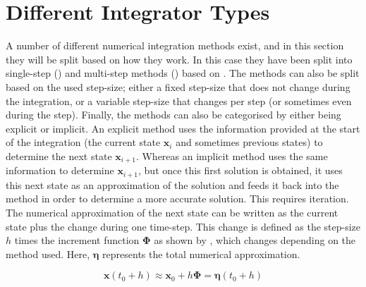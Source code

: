 \section{Different Integrator Types}
\label{sec:differentIntegratorTypes}
A number of different numerical integration methods exist, and in this section they will be split based on how they work. In this case they have been split into single-step () and multi-step methods () based on \cite{noomen2013int}. The methods can also be split based on the used step-size; either a fixed step-size that does not change during the integration, or a variable step-size that changes per step (or sometimes even during the step). Finally, the methods can also be categorised by either being explicit or implicit. An explicit method uses the information provided at the start of the integration (the current state $\mathbf{x}_{i}$ and sometimes previous states) to determine the next state $\mathbf{x}_{i+1}$. Whereas an implicit method uses the same information to determine $\mathbf{x}_{i+1}$, but once this first solution is obtained, it uses this next state as an approximation of the solution and feeds it back into the method in order to determine a more accurate solution. This requires iteration. \\
The numerical approximation of the next state can be written as the current state plus the change during one time-step. This change is defined as the step-size $h$ times the increment function 
$\mathbf{\Phi}$ as shown by , which changes depending on the method used. Here, $\mathbf{\eta}$ represents the total numerical approximation. 



\begin{equation} \label{eq:integration}
\mathbf{x}(t_{0}+h)\approx\mathbf{x}_{0}+h\bm{\Phi}=\mathbf{\eta}(t_{0}+h)
\end{equation}




